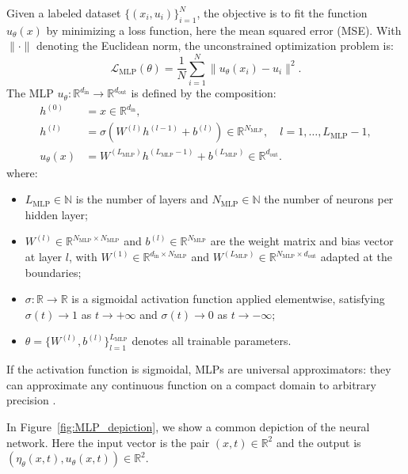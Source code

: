 Given a labeled dataset ${\{(x_i, u_i)\}}_{i=1}^{N}$, the objective is to fit the function $u_{\theta}(x)$ by minimizing a loss function, here the mean squared error (MSE). With $\|\cdot\|$ denoting the Euclidean norm, the unconstrained optimization problem is:
\begin{equation}
    \mathcal{L}_{\text{MLP}}(\theta) = \frac{1}{N} \sum_{i=1}^{N} \| u_{\theta}(x_i) - u_i \|^2. \label{eq:data_loss_nn}
\end{equation}
The MLP $u_\theta: \mathbb{R}^{d_{\mathrm{in}}} \to \mathbb{R}^{d_{\mathrm{out}}}$ is defined by the composition:
\begin{align*}
    h^{(0)}       &= x \in \mathbb{R}^{d_{\mathrm{in}}},                                                                  \\
    h^{(l)}       &= \sigma \left( W^{(l)} h^{(l-1)} + b^{(l)} \right) \in \mathbb{R}^{N_{\mathrm{MLP}}},
                   \quad l = 1, \dots, L_{\mathrm{MLP}}-1,  \\
    u_{\theta}(x) &= W^{(L_{\mathrm{MLP}})} h^{(L_{\mathrm{MLP}}-1)} + b^{(L_{\mathrm{MLP}})} \in \mathbb{R}^{d_{\mathrm{out}}}.
\end{align*}
\noindent where:
\begin{itemize}
    \item $L_{\mathrm{MLP}} \in \mathbb{N}$ is the number of layers and $N_{\mathrm{MLP}} \in \mathbb{N}$ the number of neurons per hidden layer;
    \item $W^{(l)} \in \mathbb{R}^{N_{\mathrm{MLP}} \times N_{\mathrm{MLP}}}$ and $b^{(l)} \in \mathbb{R}^{N_{\mathrm{MLP}}}$ are the weight matrix and bias vector at layer $l$, with $W^{(1)} \in \mathbb{R}^{d_{\mathrm{in}} \times N_{\mathrm{MLP}}}$ and $W^{(L_{\mathrm{MLP}})} \in \mathbb{R}^{N_{\mathrm{MLP}} \times d_{\mathrm{out}}}$ adapted at the boundaries;
    \item $\sigma : \mathbb{R} \to \mathbb{R}$ is a sigmoidal activation function applied elementwise, satisfying $\sigma(t) \to 1$ as $t \to +\infty$ and $\sigma(t) \to 0$ as $t \to -\infty$;
    \item $\theta = \{W^{(l)}, b^{(l)}\}_{l=1}^{L_{\mathrm{MLP}}}$ denotes all trainable parameters.
\end{itemize}

If the activation function is sigmoidal, MLPs are universal approximators: they can approximate any continuous function on a compact domain to arbitrary precision \parencite{cybenko1989}.

In Figure~\ref{fig:MLP_depiction}, we show a common depiction of the neural network. Here the input vector is the pair $(x,t) \in \mathbb{R}^2$ and the output is $(\eta_{\theta}(x,t), u_{\theta}(x,t)) \in \mathbb{R}^2$.


